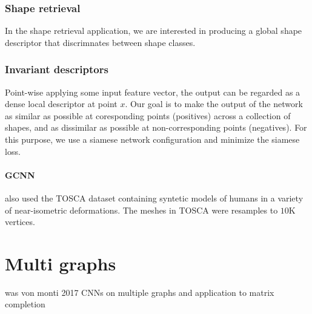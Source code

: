 \documentclass[pdftex,10pt,a4paper]{scrartcl}
\begin{document}
\subsubsection{Shape retrieval}

In the shape retrieval application, we are interested in producing a global shape descriptor that discrimnates between shape classes.

\subsubsection{Invariant descriptors}

Point-wise applying some input feature vector, the output can be regarded as a dense local descriptor at point $x$.
Our goal is to make the output of the network as similar as possible at coresponding points (positives) across a collection of shapes, and as dissimilar as possible at non-corresponding points (negatives).
For this purpose, we use a siamese network configuration and minimize the siamese loss.

\paragraph{GCNN}

also used the TOSCA dataset containing syntetic models of humans in a variety of near-isometric deformations.
The meshes in TOSCA were resamples to $10$K vertices.

\section{Multi graphs}

was von monti 2017
CNNs on multiple graphs and application to matrix completion



\end{document}
